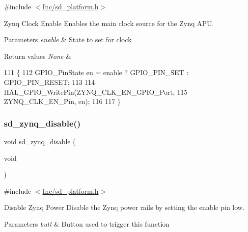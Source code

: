 {\ttfamily \#include $<$\mbox{\hyperlink{sd__platform_8h}{Inc/sd\+\_\+platform.\+h}}$>$}



Zynq Clock Enable Enables the main clock source for the Zynq A\+PU. 


\begin{DoxyParams}{Parameters}
{\em enable} & State to set for clock \\
\hline
\end{DoxyParams}

\begin{DoxyRetVals}{Return values}
{\em None} & \\
\hline
\end{DoxyRetVals}

\begin{DoxyCode}
111 \{
112     GPIO\_PinState en = enable ? GPIO\_PIN\_SET : GPIO\_PIN\_RESET;
113     
114     HAL\_GPIO\_WritePin(ZYNQ\_CLK\_EN\_GPIO\_Port, 
115               ZYNQ\_CLK\_EN\_Pin, en);
116 
117 \}
\end{DoxyCode}
\mbox{\label{group___s_d___platform___function___declarations_gaaaa432cbbf3382d321107a38a56b9bef}} 
\subsubsection{\texorpdfstring{sd\+\_\+zynq\+\_\+disable()}{sd\_zynq\_disable()}}
{\footnotesize\ttfamily void sd\+\_\+zynq\+\_\+disable (\begin{DoxyParamCaption}\item[{void}]{ }\end{DoxyParamCaption})}



{\ttfamily \#include $<$\mbox{\hyperlink{sd__platform_8h}{Inc/sd\+\_\+platform.\+h}}$>$}



Disable Zynq Power Disable the Zynq power rails by setting the enable pin low. 


\begin{DoxyParams}{Parameters}
{\em butt} & Button used to trigger this function \\
\hline
\end{DoxyParams}

